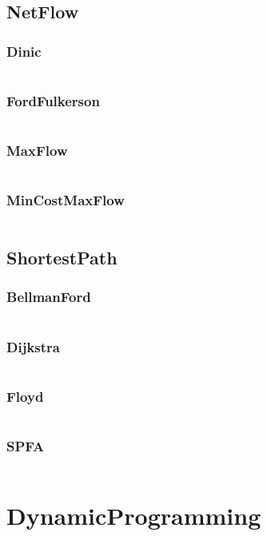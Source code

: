 \documentclass[a4paper,11pt]{article}
\begin{document}
\subsection{NetFlow}
\subsubsection{Dinic}
\inputminted[breaklines]{c++}{04++GraphTheory/+NetFlow/+Dinic.cpp}
\subsubsection{FordFulkerson}
\inputminted[breaklines]{c++}{04++GraphTheory/+NetFlow/+FordFulkerson.cpp}
\subsubsection{MaxFlow}
\inputminted[breaklines]{c++}{04++GraphTheory/+NetFlow/+MaxFlow.cpp}
\subsubsection{MinCostMaxFlow}
\inputminted[breaklines]{c++}{04++GraphTheory/+NetFlow/+MinCostMaxFlow.cpp}

\subsection{ShortestPath}
\subsubsection{BellmanFord}
\inputminted[breaklines]{c++}{04++GraphTheory/+ShortestPath/+BellmanFord.cpp}
\subsubsection{Dijkstra}
\inputminted[breaklines]{c++}{04++GraphTheory/+ShortestPath/+Dijkstra.cpp}
\subsubsection{Floyd}
\inputminted[breaklines]{c++}{04++GraphTheory/+ShortestPath/+Floyd.cpp}
\subsubsection{SPFA}
\inputminted[breaklines]{c++}{04++GraphTheory/+ShortestPath/+SPFA.cpp}


\newpage
\section{DynamicProgramming}
\end{document}
